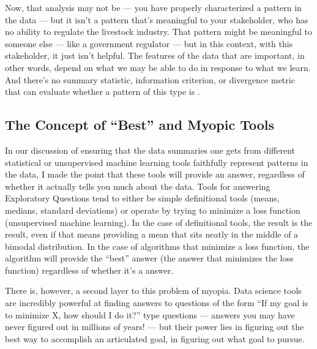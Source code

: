 \documentclass[letterpaper,10pt,english]{jupyterBook}
\begin{document}
\sphinxAtStartPar
Now, that analysis may not be  — you have properly characterized a pattern in the data — but it isn’t a pattern that’s meaningful to your stakeholder, who has no ability to regulate the livestock industry. That pattern might be meaningful to someone else — like a government regulator — but in this context, with this stakeholder, it just isn’t helpful. The features of the data that are important, in other words, depend on what we may be able to do in response to what we learn. And there’s no summary statistic, information criterion, or divergence metric that can evaluate whether a pattern of this type is .


\subsection{The Concept of “Best” and Myopic Tools}
\label{\detokenize{30_questions/19_exploratory_internal_meaningful:the-concept-of-best-and-myopic-tools}}
\sphinxAtStartPar
In our discussion of ensuring that the data summaries one gets from different statistical or unsupervised machine learning tools faithfully represent patterns in the data, I made the point that these tools will  provide an answer, regardless of whether it actually tells you much about the data. Tools for answering Exploratory Questions tend to either be simple definitional tools (means, medians, standard deviations) or operate by trying to minimize a loss function (unsupervised machine learning). In the case of definitional tools, the result is the result, even if that means providing a mean that sits neatly in the middle of a bimodal distribution. In the case of algorithms that minimize a loss function, the algorithm will provide the “best” answer (the answer that minimizes the loss function) regardless of whether it’s a  answer.

\sphinxAtStartPar
There is, however, a second layer to this problem of myopia. Data science tools are incredibly powerful at finding answers to questions of the form “If my goal is to minimize X, how should I do it?” type questions — answers you may have never figured out in millions of years! — but their power lies in figuring out the best way to accomplish an articulated goal,  in figuring out what goal to pursue.
\end{document}
